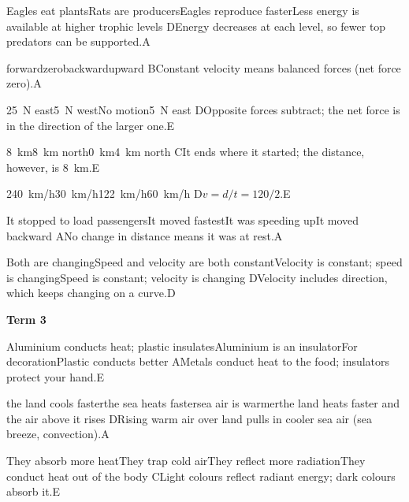 \begin{gradebody}
{Eagles eat plants}{Rats are producers}{Eagles reproduce faster}{Less energy is available at higher trophic levels}
{D}{Energy decreases at each level, so fewer top predators can be supported.}{A}

{forward}{zero}{backward}{upward}
{B}{Constant velocity means balanced forces (net force zero).}{A}

{\SI{25}{N} east}{\SI{5}{N} west}{No motion}{\SI{5}{N} east}
{D}{Opposite forces subtract; the net force is in the direction of the larger one.}{E}

{\SI{8}{km}}{\SI{8}{km} north}{\SI{0}{km}}{\SI{4}{km} north}
{C}{It ends where it started; the distance, however, is \SI{8}{km}.}{E}

{\SI{240}{km/h}}{\SI{30}{km/h}}{\SI{122}{km/h}}{\SI{60}{km/h}}
{D}{$v = d/t = 120/2$.}{E}

{It stopped to load passengers}{It moved fastest}{It was speeding up}{It moved backward}
{A}{No change in distance means it was at rest.}{A}

{Both are changing}{Speed and velocity are both constant}{Velocity is constant; speed is changing}{Speed is constant; velocity is changing}
{D}{Velocity includes direction, which keeps changing on a curve.}{D}

\textbf{Term 3}

{Aluminium conducts heat; plastic insulates}{Aluminium is an insulator}{For decoration}{Plastic conducts better}
{A}{Metals conduct heat to the food; insulators protect your hand.}{E}

{the land cools faster}{the sea heats faster}{sea air is warmer}{the land heats faster and the air above it rises}
{D}{Rising warm air over land pulls in cooler sea air (sea breeze, convection).}{A}

{They absorb more heat}{They trap cold air}{They reflect more radiation}{They conduct heat out of the body}
{C}{Light colours reflect radiant energy; dark colours absorb it.}{E}


\end{gradebody}
